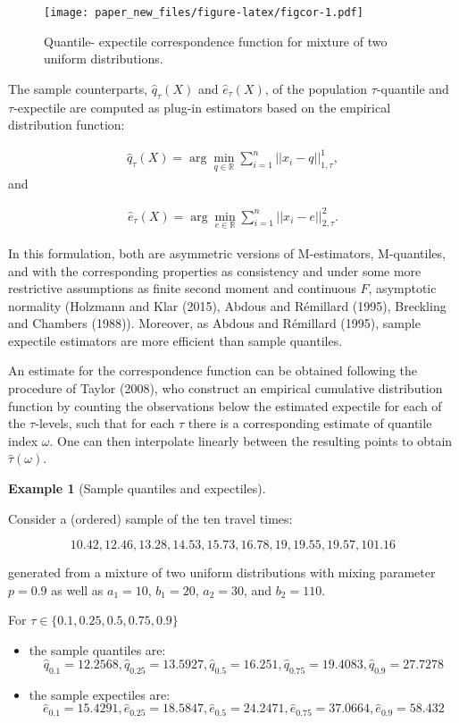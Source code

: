 \documentclass[
]{article}
\theoremstyle{definition}
\theoremstyle{definition}
\newtheorem{example}{Example}[section]
\theoremstyle{definition}
\theoremstyle{definition}
\theoremstyle{remark}
\begin{document}
\begin{figure}
\centering
\texttt{[image: paper\_new\_files/figure-latex/figcor-1.pdf]}
\caption{\label{fig:figcor}Quantile- expectile correspondence function for mixture of two uniform distributions.}
\end{figure}

The sample counterparts, \(\hat q_\tau(X)\) and \(\hat e_\tau(X)\), of the population \(\tau\)-quantile and \(\tau\)-expectile are computed as plug-in estimators based on the empirical distribution function:

\begin{align}
\hat q_\tau(X) = \arg\min_{q\in\mathbb R}\sum_{i=1}^n||x_i-q||^1_{1,\tau}, \label{eq:q}
\end{align}
and

\begin{align}
\hat e_\tau(X) = \arg\min_{e\in\mathbb R}\sum_{i=1}^n||x_i-e||^2_{2,\tau}. \label{eq:e}
\end{align}

In this formulation, both are asymmetric versions of M-estimators, M-quantiles, and with the corresponding properties as consistency and under some more restrictive assumptions as finite second moment and continuous \(F\), asymptotic normality (Holzmann and Klar (2015), Abdous and Rémillard (1995), Breckling and Chambers (1988)). Moreover, as Abdous and Rémillard (1995), sample expectile estimators are more efficient than sample quantiles.

An estimate for the correspondence function can be obtained following the procedure of Taylor (2008), who construct an empirical cumulative distribution function by counting the observations below the estimated expectile for each of the \(\tau\)-levels, such that for each \(\tau\) there is a corresponding estimate of quantile index \(\omega\). One can then interpolate linearly between the resulting points to obtain \(\hat\tau(\omega)\).

\begin{example}[Sample quantiles and expectiles]
\protect\hypertarget{exm:qande}{}\label{exm:qande}

Consider a (ordered) sample of the ten travel times:

\[10.42, 12.46, 13.28, 14.53, 15.73, 16.78, 19, 19.55, 19.57, 101.16\]

generated from a mixture of two uniform distributions with mixing parameter \(p=0.9\) as well as \(a_1=10\), \(b_1=20\), \(a_2=30\), and \(b_2=110\).

For \(\tau \in\{0.1, 0.25, 0.5, 0.75, 0.9\}\)

\begin{itemize}
\item
  the sample quantiles are:
  \[\hat q_{0.1}=12.2568, \hat q_{0.25}=13.5927,\hat q_{0.5}=16.251,\hat q_{0.75}=19.4083,\hat q_{0.9}=27.7278\]
\item
  the sample expectiles are:
  \[\hat e_{0.1}=15.4291, \hat e_{0.25}=18.5847,\hat e_{0.5}=24.2471,\hat e_{0.75}=37.0664,\hat e_{0.9}=58.432\]
\end{itemize}

\end{example}
\end{document}
